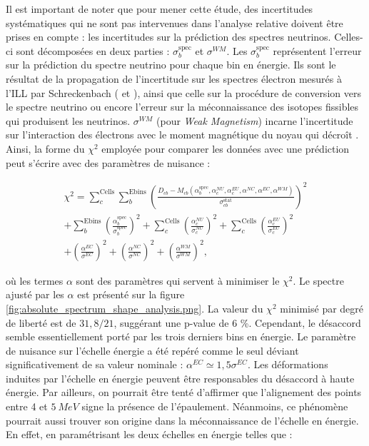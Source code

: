 
Il est important de noter que pour mener cette étude, des incertitudes systématiques qui ne sont pas intervenues dans l'analyse relative doivent être prises en compte : les incertitudes sur la prédiction des spectres neutrinos. Celles-ci sont décomposées en deux parties : $\sigma^\textrm{spec}_b$ et $\sigma^{WM}$.  Les $\sigma^\textrm{spec}_b$ représentent l'erreur sur la prédiction du spectre neutrino pour chaque bin en énergie. Ils sont le résultat de la propagation de l'incertitude sur les spectres électron mesurés à l'ILL par Schreckenbach (\cite{Schreckenbach:1981wlm} et \cite{VonFeilitzsch:1982jw}), ainsi que celle sur la procédure de conversion vers le spectre neutrino ou encore l'erreur sur la méconnaissance des isotopes fissibles qui produisent les neutrinos. $\sigma^{WM}$ (pour \textit{Weak Magnetism}) incarne l'incertitude sur l'interaction des électrons avec le moment magnétique du noyau qui décroît \cite{Huffaker:1963zz}. Ainsi, la forme du $\chi^2$ employée pour comparer les données avec une prédiction peut s'écrire avec des paramètres de nuisance :

\begin{align}
    \chi^2 = \sum_c^\textrm{Cells} \sum_b^\textrm{Ebins} \left(\frac{D_{cb} - M_{cb}(\alpha_b^\textrm{spec}, \alpha^{NU}_c, \alpha^{EU}_c, \alpha^{NC}, \alpha^{EC}, \alpha^{WM})}{\sigma_{cb}^\textrm{stat}} \right)^2\\
    + \sum_b^\textrm{Ebins} \left( \frac{\alpha_b^\textrm{spec}}{\sigma_b^\textrm{spec}} \right)^2 + \sum_c^\textrm{Cells} \left( \frac{\alpha^{NU}_c}{\sigma^{NU}_c}\right)^2 + \sum_c^\textrm{Cells} \left( \frac{\alpha^{EU}_c}{\sigma^{EU}_c}\right)^2\\
    + \left( \frac{\alpha^{EC}}{\sigma^{EC}}\right)^2 + \left( \frac{\alpha^{NC}}{\sigma^{NC}}\right)^2 + \left( \frac{\alpha^{WM}}{\sigma^{WM}}\right)^2 ,
\end{align}

\bigbreak

où les termes $\alpha$ sont des paramètres qui servent à minimiser le $\chi^2$. Le spectre ajusté par les $\alpha$ est présenté sur la figure \ref{fig:absolute_spectrum_shape_analysis.png}. La valeur du $\chi^2$ minimisé par degré de liberté est de $31,8/21$, suggérant une p-value de 6 \%. Cependant, le désaccord semble essentiellement porté par les trois derniers bins en énergie. Le paramètre de nuisance sur l'échelle énergie a été repéré comme le seul déviant significativement de sa valeur nominale : $\alpha^{EC} \simeq 1,5 \sigma^{EC}$. Les déformations induites par l'échelle en énergie peuvent être responsables du désaccord à haute énergie. Par ailleurs, on pourrait être tenté d'affirmer que l'alignement des points entre 4 et $\SI{5}{MeV}$ signe la présence de l'épaulement. Néanmoins, ce phénomène pourrait aussi trouver son origine dans la méconnaissance de l'échelle en énergie. En effet, en paramétrisant les deux échelles en énergie telles que :

